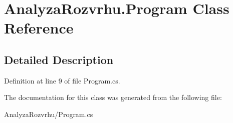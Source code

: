 \hypertarget{class_analyza_rozvrhu_1_1_program}{}\section{Analyza\+Rozvrhu.\+Program Class Reference}
\label{class_analyza_rozvrhu_1_1_program}


\subsection{Detailed Description}


Definition at line 9 of file Program.\+cs.



The documentation for this class was generated from the following file\+:\begin{DoxyCompactItemize}
\item 
Analyza\+Rozvrhu/Program.\+cs\end{DoxyCompactItemize}
